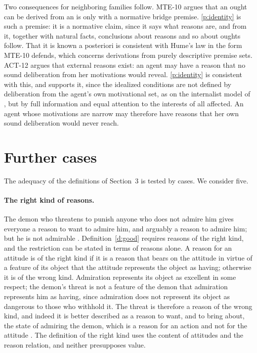 \documentclass{situationist-preprint}
\begin{document}
Two consequences for neighboring families follow. MTE-10 argues that an ought can be derived from an is only with a normative bridge premise. \ref{p:identity} is such a premise: it is a normative claim, since it says what reasons are, and from it, together with natural facts, conclusions about reasons and so about oughts follow. That it is known a posteriori is consistent with Hume's law in the form MTE-10 defends, which concerns derivations from purely descriptive premise sets. ACT-12 argues that external reasons exist: an agent may have a reason that no sound deliberation from her motivations would reveal. \ref{p:identity} is consistent with this, and supports it, since the idealized conditions are not defined by deliberation from the agent's own motivational set, as on the internalist model of \citet{Williams1981}, but by full information and equal attention to the interests of all affected. An agent whose motivations are narrow may therefore have reasons that her own sound deliberation would never reach.

\section{Further cases}\label{s:cases}

The adequacy of the definitions of Section~3 is tested by cases. We consider five.

\paragraph{The right kind of reasons.} The demon who threatens to punish anyone who does not admire him gives everyone a reason to want to admire him, and arguably a reason to admire him; but he is not admirable \citep{RabinowiczRonnow2004}. Definition~\ref{d:good} requires reasons of the right kind, and the restriction can be stated in terms of reasons alone. A reason for an attitude is of the right kind if it is a reason that bears on the attitude in virtue of a feature of its object that the attitude represents the object as having; otherwise it is of the wrong kind. Admiration represents its object as excellent in some respect; the demon's threat is not a feature of the demon that admiration represents him as having, since admiration does not represent its object as dangerous to those who withhold it. The threat is therefore a reason of the wrong kind, and indeed it is better described as a reason to want, and to bring about, the state of admiring the demon, which is a reason for an action and not for the attitude \citep{Hieronymi2005}. The definition of the right kind uses the content of attitudes and the reason relation, and neither presupposes value.
\end{document}
